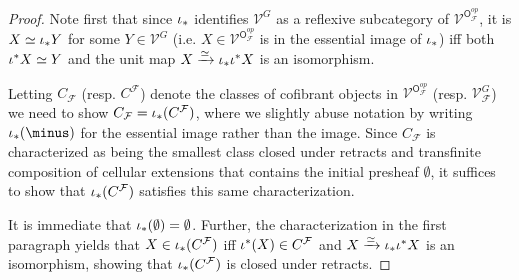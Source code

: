 \documentclass[a4paper,10pt]{article}%
\begin{document}
\begin{proof}
        Note first that since $\iota_{\**}$ identifies 
        $\mathcal{V}^{G}$ as a reflexive 
        subcategory of $\mathcal{V}^{\mathsf{O}_{\mathcal{F}}^{op}}$, 
        it is 
        $X \simeq \iota_{\**}Y$ for some 
        $Y \in \mathcal{V}^{G}$
        (i.e. $X \in \mathcal{V}^{\mathsf{O}_{\mathcal{F}}^{op}}$
        is in the essential image of $\iota_{\**}$)
        iff both $\iota^{\**}X \simeq Y$ and the unit map 
        $X \xrightarrow{\simeq} \iota_{\**} \iota^{\**}X$
        is an isomorphism.

        Letting $C_{\mathcal{F}}$ (resp. $C^{\mathcal{F}}$) denote the classes of cofibrant objects in 
        $\mathcal{V}^{\mathsf{O}_{\mathcal{F}}^{op}}$ 
        (resp. $\mathcal{V}^G_{\mathcal{F}}$)
        we need to show 
        $C_{\mathcal{F}} = \iota_{\**}(C^{\mathcal{F}})$,
        where we slightly abuse notation by writing 
        $\iota_{\**}(\minus)$ for the essential image rather than the image.
        Since $C_{\mathcal{F}}$ is characterized as being the smallest class closed under retracts and transfinite composition of cellular extensions
        that contains the initial presheaf $\emptyset$,
        it suffices to show that 
        $\iota_{\**}(C^{\mathcal{F}})$
        satisfies this same characterization.

        It is immediate that $\iota_{\**}(\emptyset) = \emptyset$.
        Further, the characterization in the first paragraph yields that 
        $X \in \iota_{\**}(C^{\mathcal{F}})$ iff $\iota^{\**}(X)\in C^{\mathcal{F}}$ and $X \xrightarrow{\simeq} \iota_{\**} \iota^{\**}X$ is an isomorphism, showing that  
        $\iota_{\**}(C^{\mathcal{F}})$ is closed under retracts.


\end{proof}
\end{document}

